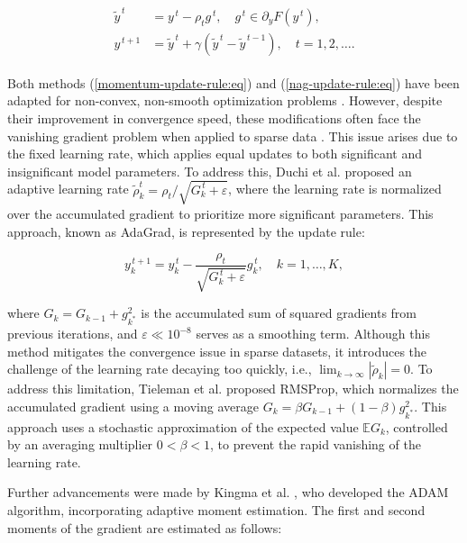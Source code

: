 \begin{eqnarray}
    \label{nag-update-rule:eq}
    \begin{aligned}
        \tilde{y}^{\,t} &= y^{\,t} - \rho_t g^{\,t}, \quad g^{\,t} \in \partial_y F(y^{\,t}), \\
        y^{\,t+1} &= \tilde{y}^{\,t} + \gamma (\tilde{y}^{\,t} - \tilde{y}^{\,t-1}), \quad t=1,2,\ldots.
    \end{aligned}
\end{eqnarray}

Both methods (\ref{momentum-update-rule:eq}) and (\ref{nag-update-rule:eq}) have been adapted for non-convex, non-smooth optimization problems \cite{mikhalevich2024}. However, despite their improvement in convergence speed, these modifications often face the vanishing gradient problem when applied to sparse data \cite{Bottou_Curtis_Nocedal_2018}. This issue arises due to the fixed learning rate, which applies equal updates to both significant and insignificant model parameters. To address this, Duchi et al. \cite{Duchi_2011} proposed an adaptive learning rate $\tilde{\rho}_k^{t} = \rho_t / \sqrt{G_k^{\,t} + \varepsilon}$, where the learning rate is normalized over the accumulated gradient to prioritize more significant parameters. This approach, known as AdaGrad, is represented by the update rule:

\begin{equation}
    \label{adagrad-update-rule:eq}
    y^{\,t+1}_k = y^{\,t}_k - \frac{\rho_t}{\sqrt{G_k^{\,t} + \varepsilon}} g^{\,t}_k, \quad k=1,\ldots,K,
\end{equation}

\noindent where $G_k = G_{k-1} + g_{k^*}^2$ is the accumulated sum of squared gradients from previous iterations, and $\varepsilon \ll 10^{-8}$ serves as a smoothing term. Although this method mitigates the convergence issue in sparse datasets, it introduces the challenge of the learning rate decaying too quickly, i.e., $\lim_{k \to \infty} | \tilde{\rho}_k | = 0$. To address this limitation, Tieleman et al. \cite{tieleman2012rmsprop} proposed RMSProp, which normalizes the accumulated gradient using a moving average $G_k = \beta G_{k-1} + (1 - \beta) g_{k^*}^2$. This approach uses a stochastic approximation of the expected value $\mathbb{E} G_k$, controlled by an averaging multiplier $0 < \beta < 1$, to prevent the rapid vanishing of the learning rate.

Further advancements were made by Kingma et al. \cite{kingma2017adam}, who developed the ADAM algorithm, incorporating adaptive moment estimation. The first and second moments of the gradient are estimated as follows:

